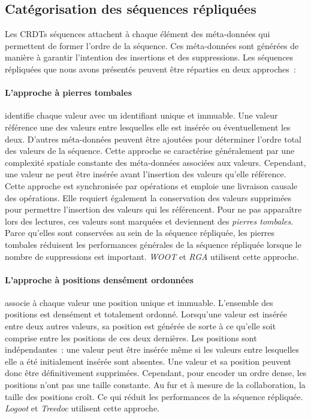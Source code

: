 

\clearpage %

\subsection{Catégorisation des séquences répliquées}

Les \acp{CRDT} séquences attachent à chaque élément des méta-données qui permettent de former l'ordre de la séquence.
Ces méta-données sont générées de manière à garantir l'intention des insertions et des suppressions.
Les séquences répliquées que nous avons présentés peuvent être réparties en deux approches~:

\paragraph{L'approche à pierres tombales}\autocite{oster_2006_woot, roh_2011_rga} identifie chaque valeur avec un identifiant unique et immuable.
Une valeur référence une des valeurs entre lesquelles elle est insérée ou éventuellement les deux.
D'autres méta-données peuvent être ajoutées pour déterminer l'ordre total des valeurs de la séquence.
Cette approche se caractérise généralement par une complexité spatiale constante des méta-données associées aux valeurs.
Cependant, une valeur ne peut être insérée avant l'insertion des valeurs qu'elle référence.
Cette approche est synchronisée par opérations et emploie une livraison causale des opérations.
Elle requiert également la conservation des valeurs supprimées pour permettre l'insertion des valeurs qui les référencent.
Pour ne pas apparaître lors des lectures, ces valeurs sont marquées et deviennent des \emph{pierres tombales}.
Parce qu'elles sont conservées au sein de la séquence répliquée, les pierres tombales réduisent les performances générales de la séquence répliquée lorsque le nombre de suppressions est important.
\emph{WOOT} et \emph{RGA} utilisent cette approche.

\paragraph{L'approche à positions densément ordonnées}\autocite{weiss_2009_logoot, preguica_2009_treedoc, nedelec_2013_lseq} associe à chaque valeur une position unique et immuable.
L'ensemble des positions est densément et totalement ordonné.
Lorsqu'une valeur est insérée entre deux autres valeurs, sa position est générée de sorte à ce qu'elle soit comprise entre les positions de ces deux dernières.
Les positions sont indépendantes~: une valeur peut être insérée même si les valeurs entre lesquelles elle a été initialement insérée sont absentes.
Une valeur et sa position peuvent donc être définitivement supprimées.
Cependant, pour encoder un ordre dense, les positions n'ont pas une taille constante.
Au fur et à mesure de la collaboration, la taille des positions croît.
Ce qui réduit les performances de la séquence répliquée.
\emph{Logoot} et \emph{Treedoc} utilisent cette approche.

